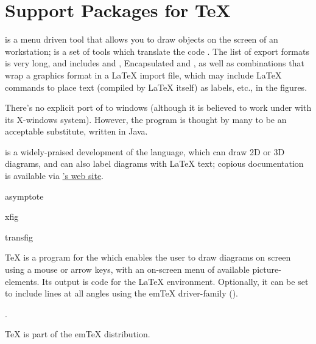 
\section{Support Packages for \TeX{}}


 is a menu driven tool that allows you to
draw objects on the screen of an  workstation; 
is a set of tools which translate the code .  The list
of export formats is very long, and includes \MF{} and \MP{},
Encapsulated \PS{} and , as well as combinations that wrap
a graphics format in a \LaTeX{} import file, which may include
\LaTeX{} commands to place text (compiled by \LaTeX{} itself) as
labels, etc., in the figures.

There's no explicit port of  to windows (although it is
believed to work under  with its X-windows system).
However, the program %
\href{http://tams-www.informatik.uni-hamburg.de/applets/jfig/}{}
is thought by many to be an acceptable substitute, written in Java.

 is a widely-praised development of the \MP{}
language, which can draw 2D or 3D diagrams, and can also label
diagrams with \LaTeX{} text; copious documentation is available via
\href{http://asymptote.sourceforge.net}{'s web site}.
\begin{ctanrefs}
\item[asymptote]
\item[xfig]
\item[transfig]
\end{ctanrefs}


\TeX{} is a program for the  which enables the user to draw diagrams
on screen using a mouse or arrow keys, with an on-screen menu of available 
picture-elements. Its output is code for the \LaTeX{}
 environment. 
Optionally, it can be set to include lines at all angles using 
the em\TeX{} driver-family
\htmlignore
().
\endhtmlignore
\begin{htmlversion}
.
\end{htmlversion}
\TeX{} is part of the em\TeX{} distribution.

